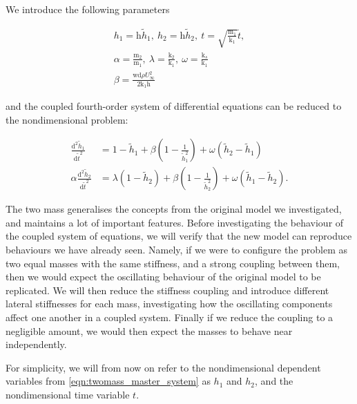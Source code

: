 \documentclass{article}
\begin{document}
We introduce the following parameters

\begin{equation*}
    \begin{aligned}
        h_1 = \mathrm{h}\tilde{h}_1,~h_2 = \mathrm{h}\tilde{h}_2,~t=\sqrt{\frac{\mathrm{m}_1}{\mathrm{k}_1}}\tilde{t}, \\
        \alpha = \frac{\mathrm{m}_2}{\mathrm{m}_1},~\lambda = \frac{\mathrm{k}_2}{\mathrm{k}_1},~\omega = \frac{\mathrm{k}_s}{\mathrm{k}_1} \\
        \beta = \frac{\mathrm{wd}\rho U_\infty^2}{2\mathrm{k}_1\mathrm{h}}
    \end{aligned}
\end{equation*}

and the coupled fourth-order system of differential equations can be reduced to the nondimensional problem:

\begin{equation}
    \begin{aligned}
        \frac{\mathrm{d}^2 \tilde{h}_1}{\mathrm{d}\tilde{t}^2} &= 1 - \tilde{h}_1 + \beta \left( 1 - \frac{1}{\tilde{h}_1^2} \right) + \omega(\tilde{h}_2-\tilde{h}_1) \\
        \alpha\frac{\mathrm{d}^2 \tilde{h}_2}{\mathrm{d}\tilde{t}^2} &= \lambda(1 - \tilde{h}_2) + \beta \left( 1 - \frac{1}{\tilde{h}_2^2} \right) + \omega(\tilde{h}_1-\tilde{h}_2).
    \end{aligned}
    \label{eqn:twomass_master_system}
\end{equation}

The two mass generalises the concepts from the original model we investigated,
and maintains a lot of important features.
Before investigating the behaviour of the coupled system of equations,
we will verify that the new model can reproduce behaviours we have already seen.
Namely, if we were to configure the problem as two equal masses with the same stiffness,
and a strong coupling between them,
then we would expect the oscillating behaviour of the original model to be replicated.
We will then reduce the stiffness coupling and introduce different lateral stiffnesses for each mass,
investigating how the oscillating components affect one another in a coupled system.
Finally if we reduce the coupling to a negligible amount,
we would then expect the masses to behave near independently.

For simplicity, we will from now on refer to the nondimensional dependent variables from \ref{eqn:twomass_master_system} as \(h_1\) and \(h_2\),
and the nondimensional time variable $t$.
\end{document}
